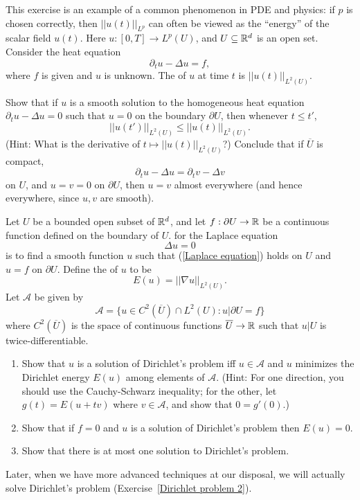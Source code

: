 \begin{exercise}
This exercise is an example of a common phenomenon in PDE and physics: if $p$ is chosen correctly, then $||u(t)||_{L^{p}}$ can often be viewed as the ``energy'' of the scalar field $u(t)$. Here $u: [0, T] \to L^{p}(U)$, and $U \subseteq \mathbb{R}^{d}$ is an open set.
Consider the heat equation
\[\partial_{t} u - \Delta u = f,\]
where $f$ is given and $u$ is unknown. The  of $u$ at time $t$ is $||u(t)||_{L^{2}(U)}$.

Show that if $u$ is a smooth solution to the homogeneous heat equation $\partial_{t} u - \Delta u = 0$ such that $u = 0$ on the boundary $\partial U$, then whenever $t \leq t'$,
\[||u(t')||_{L^{2}(U)} \leq ||u(t)||_{L^{2}(U)}.\]
(Hint: What is the derivative of $t \mapsto ||u(t)||_{L^{2}(U)}$?)
Conclude that if $\overline U$ is compact,
\[\partial_{t} u - \Delta u = \partial_{t} v - \Delta v\]
on $U$, and $u = v = 0$ on $\partial U$, then $u = v$ almost everywhere (and hence everywhere, since $u,v$ are smooth).
\end{exercise}

\begin{exercise}\label{Dirichlet problem}
Let $U$ be a bounded open subset of $\mathbb{R}^{d}$, and let $f: \partial U \to \mathbb{R}$ be a continuous function defined on the boundary of $U$.
 for the Laplace equation
\begin{equation}\label{Laplace equation}
\Delta u = 0
\end{equation}
is to find a smooth function $u$ such that (\ref{Laplace equation}) holds on $U$ and $u = f$ on $\partial U$.
Define the  of $u$ to be
\[E(u) = ||\nabla u||_{L^{2}(U)}.\]
Let $\mathcal A$ be given by
\[\mathcal A = \{u \in C^{2}(\overline U) \cap L^{2}(U): u|\partial U = f\}\]
where $C^{2}(\overline U)$ is the space of continuous functions $\overline U \to \mathbb{R}$ such that $u|U$ is twice-differentiable.
\begin{enumerate}
\item Show that $u$ is a solution of Dirichlet's problem iff $u \in \mathcal A$ and $u$ minimizes the Dirichlet energy $E(u)$ among elements of $\mathcal A$.
(Hint: For one direction, you should use the Cauchy-Schwarz inequality; for the other, let $g(t) = E(u + tv)$ where $v \in \mathcal A$, and show that $0 = g'(0)$.)
\item Show that if $f = 0$ and $u$ is a solution of Dirichlet's problem then $E(u) = 0$.
\item Show that there is at most one solution to Dirichlet's problem.
\end{enumerate}
Later, when we have more advanced techniques at our disposal, we will actually solve Dirichlet's problem (Exercise~\ref{Dirichlet problem 2}).
\end{exercise}

